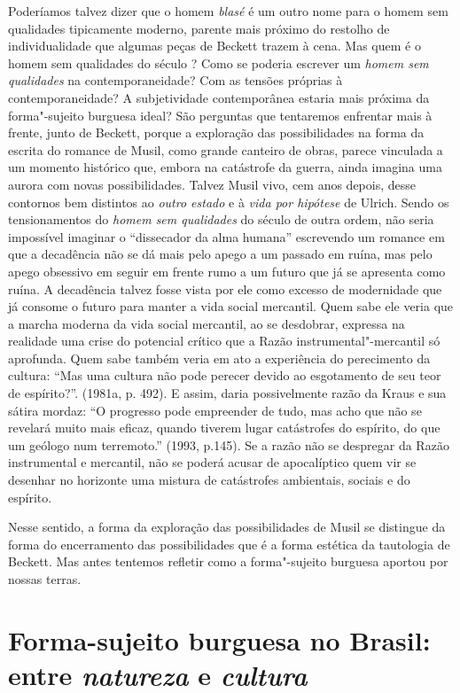 Poderíamos talvez dizer que o homem \emph{blasé} é um outro nome para o
homem sem qualidades tipicamente moderno, parente mais próximo do
restolho de individualidade que algumas peças de Beckett trazem à cena.
Mas quem é o homem sem qualidades do século ? Como se poderia
escrever um \emph{homem sem qualidades} na contemporaneidade? Com as
tensões próprias à contemporaneidade? A subjetividade contemporânea
estaria mais próxima da forma"-sujeito burguesa ideal? São perguntas que
tentaremos enfrentar mais à frente, junto de Beckett, porque a
exploração das possibilidades na forma da escrita do romance de Musil,
como grande canteiro de obras, parece vinculada a um momento histórico
que, embora na catástrofe da guerra, ainda imagina uma aurora com novas
possibilidades. Talvez Musil vivo, cem anos depois, desse contornos bem
distintos ao \emph{outro estado} e à \emph{vida por hipótese} de Ulrich.
Sendo os tensionamentos do \emph{homem sem qualidades} do século  de
outra ordem, não seria impossível imaginar o ``dissecador da alma
humana'' escrevendo um romance em que a decadência não se dá mais pelo
apego a um passado em ruína, mas pelo apego obsessivo em seguir em
frente rumo a um futuro que já se apresenta como ruína. A decadência
talvez fosse vista por ele como excesso de modernidade que já consome o
futuro para manter a vida social mercantil. Quem sabe ele veria que a
marcha moderna da vida social mercantil, ao se desdobrar, expressa na
realidade uma crise do potencial crítico que a Razão
instrumental"-mercantil só aprofunda. Quem sabe também veria em ato a
experiência do perecimento da cultura: ``Mas uma cultura não pode
perecer devido ao esgotamento de seu teor de espírito?''. (1981a, p.
492). E assim, daria possivelmente razão da Kraus e sua sátira mordaz:
``O progresso pode empreender de tudo, mas acho que não se revelará
muito mais eficaz, quando tiverem lugar catástrofes do espírito, do que
um geólogo num terremoto.'' (1993, p.145). Se a razão não se despregar
da Razão instrumental e mercantil, não se poderá acusar de apocalíptico
quem vir se desenhar no horizonte uma mistura de catástrofes ambientais,
sociais e do espírito.

Nesse sentido, a forma da exploração das possibilidades de Musil se
distingue da forma do encerramento das possibilidades que é a forma
estética da tautologia de Beckett. Mas antes tentemos refletir como a
forma"-sujeito burguesa aportou por nossas terras.

\chapter*{Forma-sujeito burguesa no Brasil: entre \emph{natureza} e \emph{cultura}}

